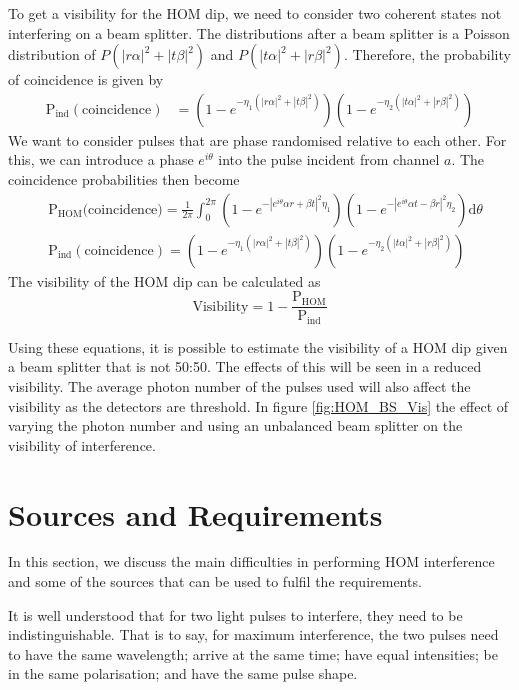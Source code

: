 To get a visibility for the HOM dip, we need to consider two coherent states not interfering on a beam splitter. The distributions after a beam splitter is a Poisson distribution of $P(|r\alpha|^2 + |t\beta|^2)$ and $P(|t\alpha|^2 + |r\beta|^2)$. Therefore, the probability of coincidence is given by
\begin{align}
	\text{P}_\text{ind}(\text{coincidence}) &= \left(1 - e^{-\eta_1(|r\alpha|^2 + |t\beta|^2)}\right)\left(1 - e^{-\eta_2(|t\alpha|^2 + |r\beta|^2)}\right)
\end{align}
We want to consider pulses that are phase randomised relative to each other. For this, we can introduce a phase $e^{i\theta}$ into the pulse incident from channel $a$. The coincidence probabilities then become
\begin{align}
	&\text{P}_\text{HOM}\text{(coincidence)} = \frac{1}{2\pi}\int_0^{2\pi}\left(1 - e^{-|e^{i\theta}\alpha r + \beta t|^2 \eta_1}\right)\left(1 - e^{-|e^{i\theta}\alpha t - \beta r|^2 \eta_2}\right)\text{d}\theta\\
	&\text{P}_\text{ind}(\text{coincidence}) = \left(1 - e^{-\eta_1(|r\alpha|^2 + |t\beta|^2)}\right)\left(1 - e^{-\eta_2(|t\alpha|^2 + |r\beta|^2)}\right)
\end{align}
The visibility of the HOM dip can be calculated as
\begin{equation}
	\text{Visibility} = 1 - \frac{\text{P}_\text{HOM}}{\text{P}_\text{ind}}
\end{equation}

Using these equations, it is possible to estimate the visibility of a HOM dip given a beam splitter that is not 50:50. The effects of this will be seen in a reduced visibility. The average photon number of the pulses used will also affect the visibility as the detectors are threshold. In figure \ref{fig:HOM_BS_Vis} the effect of varying the photon number and using an unbalanced beam splitter on the visibility of interference.

\section{Sources and Requirements}
\label{sec:sources}

In this section, we discuss the main difficulties in performing	\ac{HOM} interference and some of the sources that can be used to fulfil the requirements. 

It is well understood that for two light pulses to interfere, they need to be indistinguishable. That is to say, for maximum interference, the two pulses need to have the same wavelength; arrive at the same time; have equal intensities; be in the same polarisation; and have the same pulse shape.

